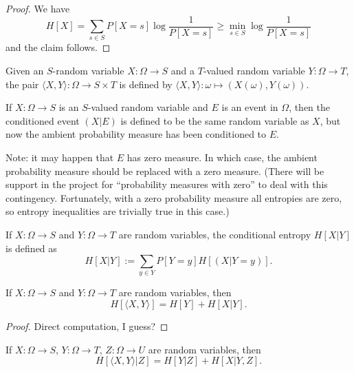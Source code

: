 \begin{proof}  We have
$$ H[X] = \sum_{s \in S} P[X=s] \log \frac{1}{P[X=s]} \geq \min_{s \in S} \log \frac{1}{P[X=s]}$$
and the claim follows.
\end{proof}

\begin{definition}\label{pair-def}
  \leanok
Given an $S$-random variable $X: \Omega \to S$ and a $T$-valued random variable $Y: \Omega \to T$, the pair $\langle X,Y \rangle: \Omega \to S \times T$ is defined by $\langle X, Y \rangle: \omega \mapsto (X(\omega), Y(\omega))$.
\end{definition}

\begin{definition}\label{condition-event-def}  If $X: \Omega \to S$ is an $S$-valued random variable and $E$ is an event in $\Omega$, then the conditioned event $(X|E)$ is defined to be the same random variable as $X$, but now the ambient probability measure has been conditioned to $E$.
\end{definition}

Note: it may happen that $E$ has zero measure.  In which case, the ambient probability measure should be replaced with a zero measure.  (There will be support in the project for ``probability measures with zero'' to deal with this contingency.  Fortunately, with a zero probability measure all entropies are zero, so entropy inequalities are trivially true in this case.)

\begin{definition}\label{conditional-entropy-def}
    If $X: \Omega \to S$ and $Y: \Omega \to T$ are random variables, the conditional entropy $H[X|Y]$ is defined as
  $$ H[X|Y] := \sum_{y \in Y} P[Y = y] H[(X | Y=y)].$$
\end{definition}

\begin{lemma}\label{chain-rule}
   
  If $X: \Omega \to S$ and $Y: \Omega \to T$ are random variables, then
  $$ H[ \langle X,Y \rangle ] = H[Y] + H[X|Y].$$
\end{lemma}

\begin{proof} Direct computation, I guess?
\end{proof}

\begin{lemma}\label{conditional-chain-rule} 
  If $X: \Omega \to S$, $Y: \Omega \to T$, $Z: \Omega \to U$ are random variables, then
$$ H[ \langle X,Y \rangle | Z ] = H[Y | Z] + H[X|Y, Z].$$
\end{lemma}

